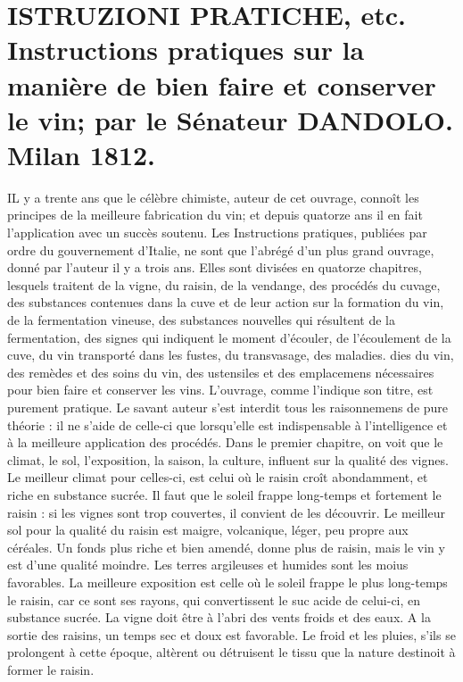 \setcounter{page}{77}
\section{ISTRUZIONI PRATICHE, etc. Instructions pratiques sur la manière de bien faire et conserver le vin; par le Sénateur DANDOLO. Milan 1812.}

IL y a trente ans que le célèbre chimiste, auteur de cet ouvrage, connoît les principes de la meilleure fabrication du vin; et depuis quatorze ans il en fait l'application avec un succès soutenu. Les Instructions pratiques, publiées par ordre du gouvernement d'Italie, ne sont que l'abrégé d'un plus grand ouvrage, donné par l'auteur il y a trois ans. Elles sont divisées en quatorze chapitres, lesquels traitent de la vigne, du raisin, de la vendange, des procédés du cuvage, des substances contenues dans la cuve et de leur action sur la formation du vin, de la fermentation vineuse, des substances nouvelles qui résultent de la fermentation, des signes qui indiquent le moment d'écouler, de l'écoulement de la cuve, du vin transporté dans les fustes, du transvasage, des maladies.\setcounter{page}{78} dies du vin, des remèdes et des soins du vin, des ustensiles et des emplacemens nécessaires pour bien faire et conserver les vins.
L’ouvrage, comme l’indique son titre, est purement pratique. Le savant auteur s’est interdit tous les raisonnemens de pure théorie : il ne s’aide de celle-ci que lorsqu’elle est indispensable à l’intelligence et à la meilleure application des procédés.
Dans le premier chapitre, on voit que le climat, le sol, l’exposition, la saison, la culture, influent sur la qualité des vignes. Le meilleur climat pour celles-ci, est celui où le raisin croît abondamment, et riche en substance sucrée. Il faut que le soleil frappe long-temps et fortement le raisin : si les vignes sont trop couvertes, il convient de les découvrir.
Le meilleur sol pour la qualité du raisin est maigre, volcanique, léger, peu propre aux céréales. Un fonds plus riche et bien amendé, donne plus de raisin, mais le vin y est d’une qualité moindre. Les terres argileuses et humides sont les moius favorables.
La meilleure exposition est celle où le soleil frappe le plus long-temps le raisin, car ce sont ses rayons, qui convertissent le suc\setcounter{page}{79} acide de celui-ci, en substance sucrée. La vigne doit être à l'abri des vents froids et des eaux.
A la sortie des raisins, un temps sec et doux est favorable. Le froid et les pluies, s'ils se prolongent à cette époque, altèrent ou détruisent le tissu que la nature destinoit à former le raisin.
